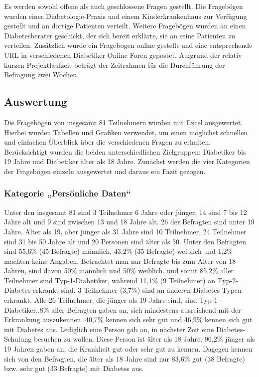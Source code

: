 \documentclass[a4paper,11pt]{article}%
\renewcommand{\\}{\vspace*{0.5\baselineskip} \newline}
\begin{document}
	Es werden sowohl offene als auch geschlossene Fragen gestellt. Die Fragebögen wurden einer Diabetologie-Praxis und einem Kinderkrankenhaus zur Verfügung gestellt und an dortige Patienten verteilt. Weitere Fragebögen wurden an einen Diabetesberater geschickt, der sich bereit erklärte, sie an seine Patienten zu verteilen. Zusätzlich wurde ein Fragebogen online gestellt und eine entsprechende URL in verschiedenen Diabetiker Online Foren gepostet.\newline
	Aufgrund der relativ kurzen Projektlaufzeit beträgt der Zeitrahmen für die Durchführung der Befragung zwei Wochen.
	\subsection{Auswertung}
	Die Fragebögen von insgesamt 81 Teilnehmern wurden mit Excel ausgewertet. Hierbei wurden Tabellen und Grafiken verwendet, um einen möglichst schnellen und einfachen Überblick über die verschiedenen Fragen zu erhalten. Berücksichtigt wurden die beiden unterschiedlichen Zielgruppen: Diabetiker bis 19 Jahre und Diabetiker älter als 18 Jahre. Zunächst werden die vier Kategorien der Fragebögen einzeln ausgewertet und daraus ein Fazit gezogen.
	\subsubsection{Kategorie „Persönliche Daten“}
	Unter den insgesamt 81 sind 3 Teilnehmer 6 Jahre oder jünger, 14 sind 7 bis 12 Jahre alt und 9 sind zwischen 13 und 18 Jahre alt. 26 der Befragten sind unter 19 Jahre. Älter als 19, aber jünger als 31 Jahre sind 10 Teilnehmer, 24 Teilnehmer sind 31 bis 50 Jahre alt und 20 Personen sind älter als 50.\newline
	Unter den Befragten sind 55,6\% (45 Befragte) männlich, 43,2\% (35 Befragte) weiblich und 1,2\% machten keine Angaben. Betrachtet man nur Befragte bis zum Alter von 18 Jahren, sind davon 50\% männlich und 50\% weiblich. und somit 85,2\% aller Teilnehmer sind Typ-1-Diabetiker, während 11,1\% (9 Teilnehmer) an Typ-2-Diabetes erkrankt sind. 3 Teilnehmer (3,7\%) sind an anderen Diabetes-Typen erkrankt. Alle 26 Teilnehmer, die jünger als 19 Jahre sind, sind Typ-1-Diabetiker.,8\% aller Befragten gaben an, sich mindestens ausreichend mit der Erkrankung auszukennen. 40,7\% kennen sich sehr gut und 46,9\% kennen sich gut mit Diabetes aus. Lediglich eine Person gab an, in nächster Zeit eine Diabetes-Schulung besuchen zu wollen. Diese Person ist älter als 18 Jahre. 96,2\% jünger als 19 Jahren gaben an, die Krankheit gut oder sehr gut zu kennen. Dagegen kennen sich von den Befragten, die älter als 18 Jahre sind nur 83,6\% gut (38 Befragte) bzw. sehr gut (33 Befragte) mit Diabetes aus.
\end{document}
